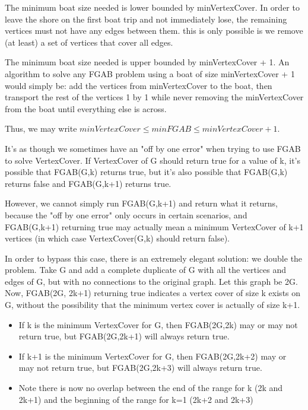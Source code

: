 \documentclass[a4paper]{article}
\begin{document}
The minimum boat size needed is lower bounded by minVertexCover. In order to leave the shore on the first boat trip and not immediately lose, the remaining vertices must not have any edges between them. this is only possible is we remove (at least) a set of vertices that cover all edges.

The minimum boat size needed is upper bounded by minVertexCover + 1. An algorithm to solve any FGAB problem using a boat of size minVertexCover + 1 would simply be: add the vertices from minVertexCover to the boat, then transport the rest of the vertices 1 by 1 while never removing the minVertexCover from the boat until everything else is across.

Thus, we may write $minVertexCover \leq minFGAB \leq minVertexCover + 1$.

It's as though we sometimes have an "off by one error" when trying to use FGAB to solve VertexCover. If VertexCover of G should return true for a value of k, it's possible that FGAB(G,k) returns true, but it's also possible that FGAB(G,k) returns false and FGAB(G,k+1) returns true.

However, we cannot simply run FGAB(G,k+1) and return what it returns, because the "off by one error" only occurs in certain scenarios, and FGAB(G,k+1) returning true may actually mean a minimum VertexCover of k+1 vertices (in which case VertexCover(G,k) should return false).

In order to bypass this case, there is an extremely elegant solution: we double the problem. Take G and add a complete duplicate of G with all the vertices and edges of G, but with no connections to the original graph. Let this graph be 2G. Now, FGAB(2G, 2k+1) returning true indicates a vertex cover of size k exists on G, without the possibility that the minimum vertex cover is actually of size k+1.

\begin{itemize}
    \item If k is the minimum VertexCover for G, then FGAB(2G,2k) may or may not return true, but FGAB(2G,2k+1) will always return true. 
    \item If k+1 is the minimum VertexCover for G, then FGAB(2G,2k+2) may or may not return true, but FGAB(2G,2k+3) will always return true.
    \item Note there is now no overlap between the end of the range for k (2k and 2k+1) and the beginning of the range for k=1 (2k+2 and 2k+3)
\end{itemize}
\end{document}
